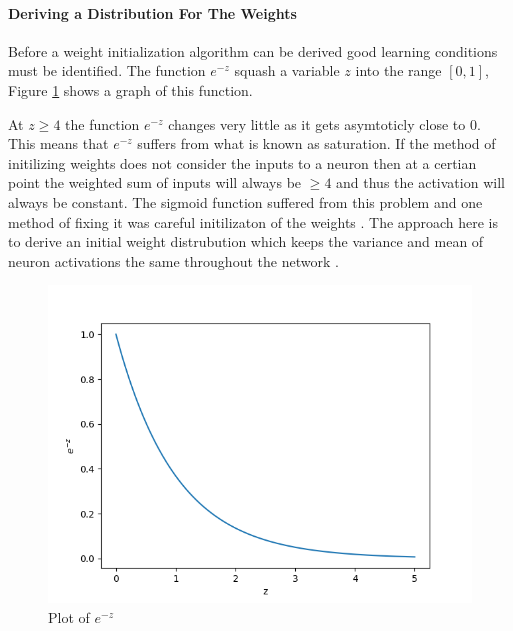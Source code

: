 \paragraph{Deriving a Distribution For The Weights}
Before a weight initialization algorithm can be derived good learning conditions must be identified. The function $e^{-z}$ squash a variable $z$ into the range $[0,1]$, Figure \ref{fig:activation-plot} shows a graph of this function.\\
\noindent
\begin{minipage}[t]{0.55\textwidth}
\vspace{0px}
At $z \geq 4$ the function $e^{-z}$ changes very little as it gets asymtoticly close to 0. This means that $e^{-z}$ suffers from what is known as saturation. If the method of initilizing weights does not consider the inputs to a neuron then at a certian point the weighted sum of inputs will always be $\geq 4$ and thus the activation will always be constant. The sigmoid function suffered from this problem and one method of fixing it was careful initilizaton of the weights \cite{glorot2010understanding}. The approach here is to derive an initial weight distrubution which keeps the variance and mean of neuron activations the same throughout the network \cite{kumar2017weight}. \\
\end{minipage}
\hspace{0.05\textwidth}
\begin{minipage}[t]{0.4\textwidth}
\vspace{0px}
\begin{figure}[H]
\vspace{0px}
    \includegraphics[width=\textwidth]{activation-plot.png}
    \caption{Plot of $e^{-z}$}
    \label{fig:activation-plot}
\end{figure}
\end{minipage}

